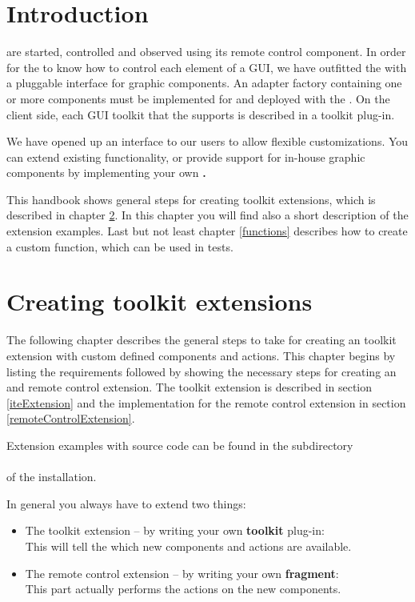 \chapter{Introduction}
\label{introduction}

\gdauts{} are started, controlled and observed using its remote control component. In
order for the \gdagent to know how to control each element of a GUI, we have
outfitted the \gdagent with a pluggable interface for graphic components. An
adapter factory containing one or more components must be implemented for and
deployed with the \gdaut. On the client side, each GUI toolkit that the \ite{}
supports is described in a toolkit plug-in.

We have opened up an interface to our users to allow flexible
customizations. You can extend existing functionality, or provide support for
in-house graphic components by implementing your own \textbf{\gdtesterclasses.}

This handbook shows general steps for creating \ite{} toolkit extensions, which
is described in chapter \ref{toolkitExtension}. In this chapter you will find
also  a short description of the extension examples. Last but not least chapter
\ref{functions} describes how to create a custom \ite{} function, which can be
used in tests.

\chapter{Creating toolkit extensions}
\label{toolkitExtension}

The following chapter describes the general steps to take for creating an \ite{}
toolkit extension with custom defined components and actions. This chapter
begins by listing the requirements followed by showing the necessary steps
for creating an \ite{} and remote control extension. The \ite{} toolkit extension is
described in section \ref{iteExtension} and the implementation for the remote
control extension in section \ref{remoteControlExtension}.

Extension examples with source code can be found in the subdirectory\\
\\
of the  installation.

In general you always have to extend two things:
\begin{itemize}
\item The \ite{} toolkit extension --  by writing your own \textbf{toolkit} plug-in:\\
      This will tell the \ite{} which new components and actions are
      available.
\item The remote control extension -- by writing your own \textbf{fragment}:\\
      This part actually performs the actions on the new components.
\end{itemize}

